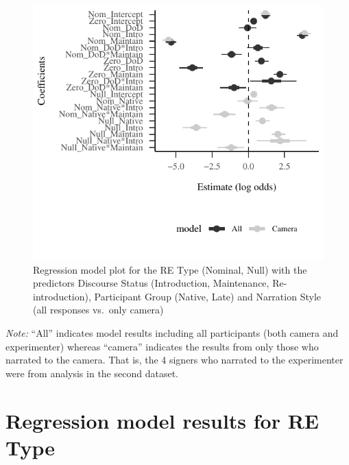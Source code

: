 \documentclass[]{elsarticle} %
\begin{document}
\begin{figure}
\centering
\includegraphics{revised_manuscript_files/figure-latex/model-camera-1.pdf}
\caption{Regression model plot for the RE Type (Nominal, Null) with the
predictors Discourse Status (Introduction, Maintenance,
Re-introduction), Participant Group (Native, Late) and Narration Style
(all responses vs.~only camera)}
\end{figure}

\emph{Note:} ``All'' indicates model results including all participants
(both camera and experimenter) whereas ``camera'' indicates the results
from only those who narrated to the camera. That is, the 4 signers who
narrated to the experimenter were from analysis in the second dataset.

\clearpage

\hypertarget{regression-model-results-for-re-type}{%
\section{Regression model results for RE
Type}\label{regression-model-results-for-re-type}}

\label{section:modelResult}
\end{document}
